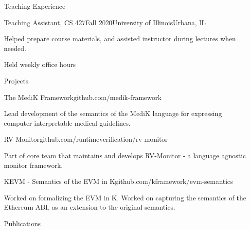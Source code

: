 \documentclass{resume} %
\begin{document}
\begin{rSection}{Teaching Experience}

\begin{rSubsection}{Teaching Assistant, CS 427}{Fall 2020}{University of Illinois}{Urbana, IL}
\item Helped prepare course materials, and assisted instructor during lectures
  when needed.
\item Held weekly office hours
\end{rSubsection}
\end{rSection}


\begin{rSection}{Projects}

\begin{rSubsection}{The MediK Framework}{github.com/medik-framework}{}{}
\item Lead development of the semantics of the MediK language for expressing
  computer interpretable medical guidelines.
\end{rSubsection}

\begin{rSubsection}{RV-Monitor}{github.com/runtimeverification/rv-monitor}{}{}
\item Part of core team that maintains and develops RV-Monitor - a language
  agnostic monitor framework.
\end{rSubsection}

\begin{rSubsection}{KEVM - Semantics of the EVM in K}{github.com/kframework/evm-semantics}{}{}
\item Worked on formalizing the EVM in K. Worked on capturing the semantics of the Ethereum ABI, as
  an extension to the original semantics.
\end{rSubsection}

\end{rSection}

\begin{rSection}{Publications}
    \item {}
    \item {}
    \item {}
    \item {}
    \item {}
\end{rSection}


%
%
\end{document}
